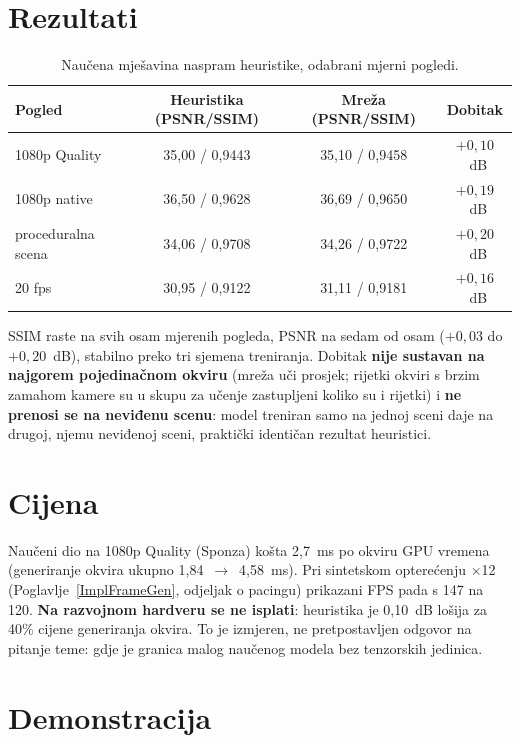 \documentclass{mathos}
\begin{document}
\section{Rezultati}

\begin{table}[hbtp]
\centering
\begin{tabular}{|l|c|c|c|}\hline
Pogled & Heuristika (PSNR/SSIM) & Mreža (PSNR/SSIM) & Dobitak \\\hline
1080p Quality & 35,00 / 0,9443 & 35,10 / 0,9458 & $+0,10$~dB \\\hline
1080p native & 36,50 / 0,9628 & 36,69 / 0,9650 & $+0,19$~dB \\\hline
proceduralna scena & 34,06 / 0,9708 & 34,26 / 0,9722 & $+0,20$~dB \\\hline
20 fps & 30,95 / 0,9122 & 31,11 / 0,9181 & $+0,16$~dB \\\hline
\end{tabular}
\caption{Naučena mješavina naspram heuristike, odabrani mjerni pogledi.}
\label{table_m9_rezultati}
\end{table}

SSIM raste na svih osam mjerenih pogleda, PSNR na sedam od osam
($+0,03$ do $+0,20$~dB), stabilno preko tri sjemena treniranja. Dobitak
\textbf{nije sustavan na najgorem pojedinačnom okviru} (mreža uči prosjek;
rijetki okviri s brzim zamahom kamere su u skupu za učenje zastupljeni
koliko su i rijetki) i \textbf{ne prenosi se na neviđenu scenu}: model
treniran samo na jednoj sceni daje na drugoj, njemu neviđenoj sceni,
praktički identičan rezultat heuristici.

\section{Cijena}

Naučeni dio na 1080p Quality (Sponza) košta 2,7~ms po okviru GPU vremena
(generiranje okvira ukupno 1,84~$\to$~4,58~ms). Pri sintetskom opterećenju
$\times$12 (Poglavlje~\ref{ImplFrameGen}, odjeljak o pacingu) prikazani FPS
pada s 147 na 120. \textbf{Na razvojnom hardveru se ne isplati}: heuristika
je 0,10~dB lošija za 40\% cijene generiranja okvira. To je izmjeren, ne
pretpostavljen odgovor na pitanje teme: gdje je granica malog naučenog
modela bez tenzorskih jedinica.

\section{Demonstracija}
\end{document}
